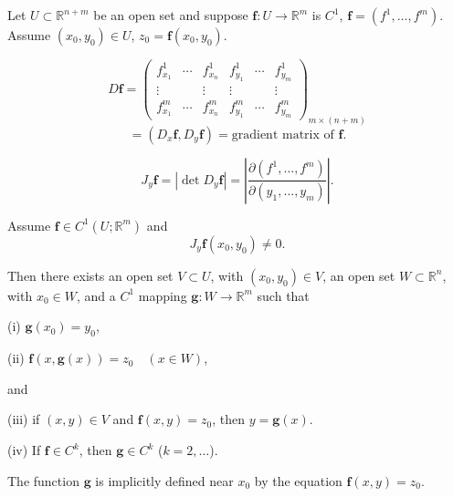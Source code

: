 Let $U \subset \mathbb{R}^{n+m}$ be an open set and suppose $\mathbf{f}: U \to \mathbb{R}^m$ is $C^1$, $\mathbf{f} = (f^1, \ldots, f^m)$. Assume $(x_0, y_0) \in U$, $z_0 = \mathbf{f}(x_0, y_0)$.

\begin{definition}
\label{def:gradient-matrix-df-rectangular-notation}
$$D\mathbf{f} = \begin{pmatrix} f^1_{x_1} & \cdots & f^1_{x_n} & f^1_{y_1} & \cdots & f^1_{y_m} \\ \vdots & & \vdots & \vdots & & \vdots \\ f^m_{x_1} & \cdots & f^m_{x_n} & f^m_{y_1} & \cdots & f^m_{y_m} \end{pmatrix}_{m \times (n+m)}$$
$$= (D_x \mathbf{f}, D_y \mathbf{f}) = \text{gradient matrix of } \mathbf{f}.$$
\end{definition}

\begin{definition}
\label{def:jacobian-jyf}
$$J_y \mathbf{f} = |\det D_y \mathbf{f}| = \left| \frac{\partial(f^1, \ldots, f^m)}{\partial(y_1, \ldots, y_m)} \right|.$$
\end{definition}

\begin{figure}[h]\centering
\end{figure}

\begin{theorem}
\label{thm:implicit-function-theorem}
Assume $\mathbf{f} \in C^1(U; \mathbb{R}^m)$ and
$$J_y \mathbf{f}(x_0, y_0) \neq 0.$$

Then there exists an open set $V \subset U$, with $(x_0, y_0) \in V$, an open set $W \subset \mathbb{R}^n$, with $x_0 \in W$, and a $C^1$ mapping $\mathbf{g} : W \to \mathbb{R}^m$ such that

(i) $\mathbf{g}(x_0) = y_0$,

(ii) $\mathbf{f}(x, \mathbf{g}(x)) = z_0 \quad (x \in W)$,

and

(iii) if $(x,y) \in V$ and $\mathbf{f}(x,y) = z_0$, then $y = \mathbf{g}(x)$.

(iv) If $\mathbf{f} \in C^k$, then $\mathbf{g} \in C^k$ ($k = 2, \ldots$).

The function $\mathbf{g}$ is implicitly defined near $x_0$ by the equation $\mathbf{f}(x,y) = z_0$.
\end{theorem}

